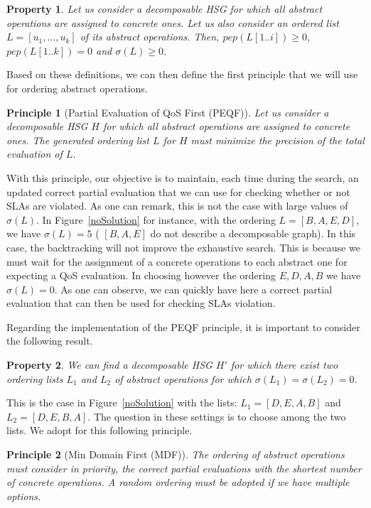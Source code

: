 \documentclass[a4paper]{article}
\newtheorem{principle}{Principle}
\newtheorem{property}{Property}
\begin{document}
\begin{property}
Let us consider a decomposable HSG for which all abstract operations are assigned to 
concrete ones. Let us also consider an ordered list $L = [ u_1, \dots, u_k ]$ of its abstract operations. Then,  
$pep(L[1..i]) \geq 0$,  $pep(L[1..k]) = 0$ and  $\displaystyle \sigma(L) \geq 0$. 
\end{property}


Based on these definitions, we can then define the first principle that we will use for 
ordering abstract operations.


\begin{principle}[Partial Evaluation of QoS First (PEQF)]
Let us consider a decomposable HSG $H$ for which all abstract operations are assigned to 
concrete ones. The generated ordering list $L$ for $H$ must minimize the precision of the total  
evaluation of $L$.
\end{principle}

With this principle, our objective is to maintain, each time during the search, an updated correct 
partial evaluation that we can use for checking whether or not SLAs are violated. As one can remark, this 
is not the case with large values of $\sigma(L)$. 
In Figure~\ref{noSolution} for instance, with the ordering $L = [B, A, E, D]$, we have $\displaystyle \sigma(L) = 5$ ( 
$[B, A, E]$ do not describe a decomposable graph). In this case, the backtracking will 
not improve the exhaustive search. This is because we must wait for the assignment of a concrete operations to 
each abstract one for expecting a QoS evaluation. In choosing however 
the ordering $E, D, A, B$ we have $\displaystyle \sigma(L) = 0$. As one can observe, we can 
quickly have here a correct partial evaluation that can then be used for checking SLAs violation. 

Regarding the implementation of the PEQF principle, it is important to consider the following 
result. 

\begin{property}
We can find a decomposable HSG $H'$ for which there exist two ordering lists $L_1$ and $L_2$ of 
abstract operations for which $\sigma(L_1) = \sigma(L_2) = 0$. 
\end{property}

This is the case in Figure~\ref{noSolution} with the lists:  
$L_1 = [D, E, A, B]$ and  $L_2 = [D, E, B, A]$. The question in these settings is to choose among the 
two lists.  We adopt for this following principle.

\begin{principle}[Min Domain First (MDF)]
The ordering of abstract operations must consider in priority, the correct partial evaluations with 
the shortest number of concrete operations. A random ordering must be adopted if we have multiple 
options. 
\end{principle}
\end{document}
